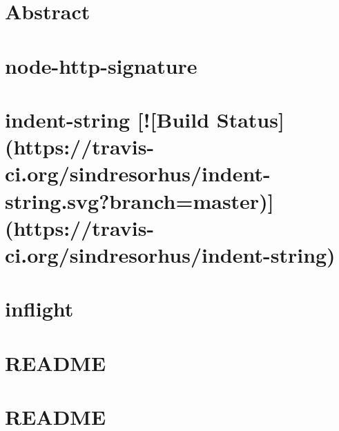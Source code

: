\documentclass[twoside]{book}
\newcommand{\+}{\discretionary{\mbox{\scriptsize$\hookleftarrow$}}{}{}}
\begin{document}
\chapter{Abstract}
\label{md_dsmacc_vis_degree_node_modules_http-signature_http_signing}

\chapter{node-\/http-\/signature}
\label{md_dsmacc_vis_degree_node_modules_http-signature_README}

\chapter{indent-\/string \mbox{[}!\mbox{[}Build Status\mbox{]}(https\+://travis-\/ci.org/sindresorhus/indent-\/string.svg?branch=master)\mbox{]}(https\+://travis-\/ci.org/sindresorhus/indent-\/string)}
\label{md_dsmacc_vis_degree_node_modules_indent-string_readme}

\chapter{inflight}
\label{md_dsmacc_vis_degree_node_modules_inflight_README}

\chapter{R\+E\+A\+D\+ME}
\label{md_dsmacc_vis_degree_node_modules_inherits_README}

\chapter{R\+E\+A\+D\+ME}
\label{md_dsmacc_vis_degree_node_modules_ini_README}

\end{document}

